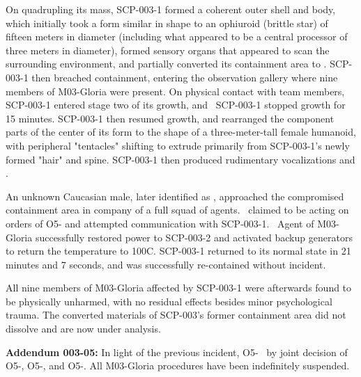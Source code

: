 On quadrupling its mass, SCP-003-1 formed a coherent outer shell and body, which initially took a form similar in shape to an ophiuroid (brittle star) of fifteen meters in diameter (including what appeared to be a central processor of three meters in diameter), formed sensory organs that appeared to scan the surrounding environment, and partially converted its containment area to \redacted. SCP-003-1 then breached containment, entering the observation gallery where nine members of M03-Gloria were present. On physical contact with team members, SCP-003-1 entered stage two of its growth, and \expunged \ SCP-003-1 stopped growth for 15 minutes. SCP-003-1 then resumed growth, and rearranged the component parts of the center of its form to the shape of a three-meter-tall female humanoid, with peripheral "tentacles" shifting to extrude primarily from SCP-003-1's newly formed "hair" and spine. SCP-003-1 then produced rudimentary vocalizations and \expunged.

An unknown Caucasian male, later identified as \redacted, approached the compromised containment area in company of a full squad of agents. \redacted \ claimed to be acting on orders of O5- and attempted communication with SCP-003-1. \expunged \ Agent  of M03-Gloria successfully restored power to SCP-003-2 and activated backup generators to return the temperature to 100\degree C. SCP-003-1 returned to its normal state in 21 minutes and 7 seconds, and was successfully re-contained without incident.

All nine members of M03-Gloria affected by SCP-003-1 were afterwards found to be physically unharmed, with no residual effects besides minor psychological trauma. The converted materials of SCP-003's former containment area did not dissolve and are now under analysis.

\textbf{Addendum 003-05:} In light of the previous incident, O5- \expunged \ by joint decision of O5-, O5-, and O5-. All M03-Gloria procedures have been indefinitely suspended.
